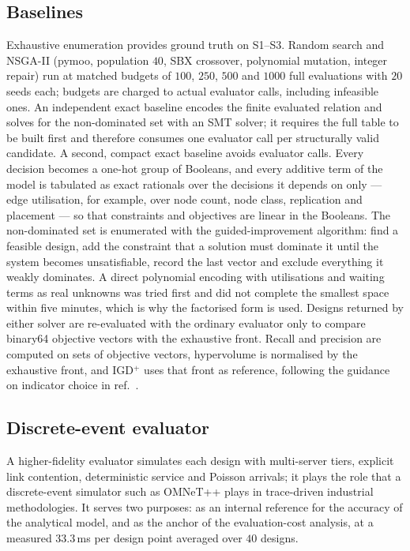\documentclass[pdflatex,sn-nature,lineno]{sn-jnl}
\newcommand{\DesCostMs}{33.3}
\begin{document}
\subsection{Baselines}
Exhaustive enumeration provides ground truth on S1--S3. Random search and
NSGA-II\cite{deb2002nsga2} (pymoo\cite{blank2020pymoo}, population $40$, SBX crossover,
polynomial mutation, integer repair) run at matched budgets of $100$, $250$, $500$ and
$1000$ full evaluations with $20$ seeds each; budgets are charged to actual evaluator
calls, including infeasible ones. An independent exact baseline encodes the finite
evaluated relation and solves for the non-dominated set with an SMT
solver\cite{demoura2008z3}; it requires the full table to be built first and therefore
consumes one evaluator call per structurally valid candidate. A second, compact exact
baseline avoids evaluator calls. Every decision becomes a one-hot group of Booleans, and
every additive term of the model is tabulated as exact rationals over the decisions it
depends on only --- edge utilisation, for example, over node count, node class,
replication and placement --- so that constraints and objectives are linear in the
Booleans. The non-dominated set is enumerated with the guided-improvement algorithm: find
a feasible design, add the constraint that a solution must dominate it until the system
becomes unsatisfiable, record the last vector and exclude everything it weakly dominates.
A direct polynomial encoding with utilisations and waiting terms as real unknowns was
tried first and did not complete the smallest space within five minutes, which is why the
factorised form is used. Designs returned by either solver are re-evaluated with the
ordinary evaluator only to compare binary64 objective vectors with the exhaustive front.
Recall and precision are
computed on sets of objective vectors, hypervolume\cite{zitzler1999hv} is normalised by
the exhaustive front, and IGD$^{+}$\cite{ishibuchi2015igdplus} uses that front as
reference, following the guidance on indicator choice in ref.~.

\subsection{Discrete-event evaluator}
A higher-fidelity evaluator simulates each design with multi-server tiers, explicit link
contention, deterministic service and Poisson arrivals; it plays the role that a
discrete-event simulator such as OMNeT++\cite{varga2008omnet} plays in trace-driven
industrial methodologies\cite{saadatmand2025compdse}. It serves two purposes: as an
internal reference for the accuracy of the analytical model, and as the anchor of the
evaluation-cost analysis, at a measured $\DesCostMs$\,ms per design point averaged over
$40$ designs.
\end{document}
